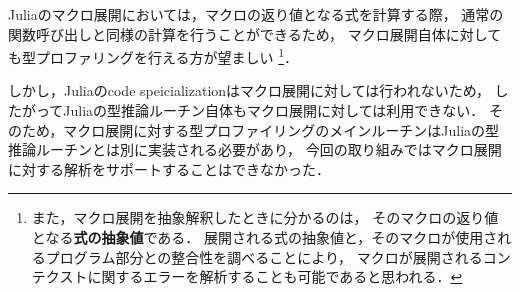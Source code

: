 Juliaのマクロ展開においては，マクロの返り値となる式を計算する際，
通常の関数呼び出しと同様の計算を行うことができるため，
マクロ展開自体に対しても型プロファリングを行える方が望ましい
\footnote{
  また，マクロ展開を抽象解釈したときに分かるのは，
  そのマクロの返り値となる\textbf{式の抽象値}である．
  展開される式の抽象値と，そのマクロが使用されるプログラム部分との整合性を調べることにより，
  マクロが展開されるコンテクストに関するエラーを解析することも可能であると思われる．
}．

しかし，Juliaのcode speicializationはマクロ展開に対しては行われないため，
したがってJuliaの型推論ルーチン自体もマクロ展開に対しては利用できない．
そのため，マクロ展開に対する型プロファイリングのメインルーチンはJuliaの型推論ルーチンとは別に実装される必要があり，
今回の取り組みではマクロ展開に対する解析をサポートすることはできなかった．
